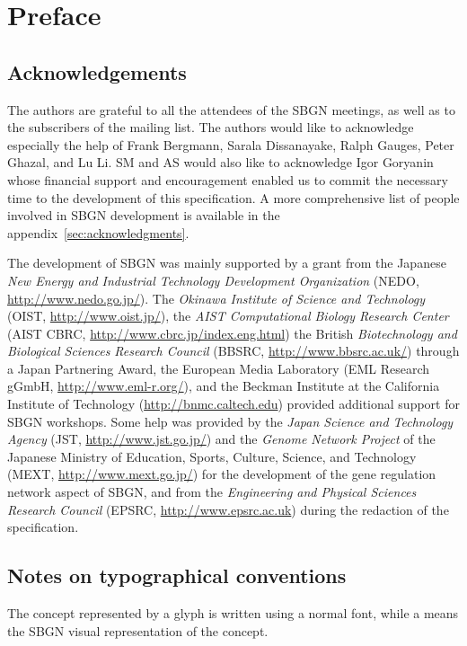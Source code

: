 
\chapter{Preface}

\section*{Acknowledgements}

The authors are grateful to all the attendees of the SBGN meetings, as well as to the subscribers of the  mailing list.  The authors would like to acknowledge especially the help of Frank Bergmann, Sarala Dissanayake, Ralph Gauges, Peter Ghazal, and Lu Li. SM and AS would also like to acknowledge Igor Goryanin whose financial support and encouragement enabled us to commit the necessary time to the development of this specification. A more comprehensive list of people involved in SBGN development is available in the appendix~\ref{sec:acknowledgments}.

The development of SBGN was mainly supported by a grant from the Japanese \emph{New Energy and Industrial Technology Development Organization} (NEDO, \url{http://www.nedo.go.jp/}).  The \emph{Okinawa Institute of Science and Technology} (OIST, \url{http://www.oist.jp/}), the \emph{AIST Computational Biology Research Center} (AIST CBRC, \url{http://www.cbrc.jp/index.eng.html}) the British \emph{Biotechnology and Biological Sciences Research Council} (BBSRC, \url{http://www.bbsrc.ac.uk/}) through a Japan Partnering Award, the European Media Laboratory (EML Research gGmbH, \url{http://www.eml-r.org/}), and the Beckman Institute at the California Institute of Technology (\url{http://bnmc.caltech.edu}) provided additional support for SBGN workshops.  Some help was provided by the \emph{Japan Science and Technology Agency} (JST, \url{http://www.jst.go.jp/}) and the \emph{Genome Network Project} of the Japanese Ministry of Education, Sports, Culture, Science, and Technology (MEXT, \url{http://www.mext.go.jp/}) for the development of the gene regulation network aspect of SBGN, and from the \emph{Engineering and Physical Sciences Research Council} (EPSRC, \url{http://www.epsrc.ac.uk}) during the redaction of the specification.

\section*{Notes on typographical conventions}

The concept represented by a glyph is written using a normal font, while a  means the SBGN visual representation of the concept.



